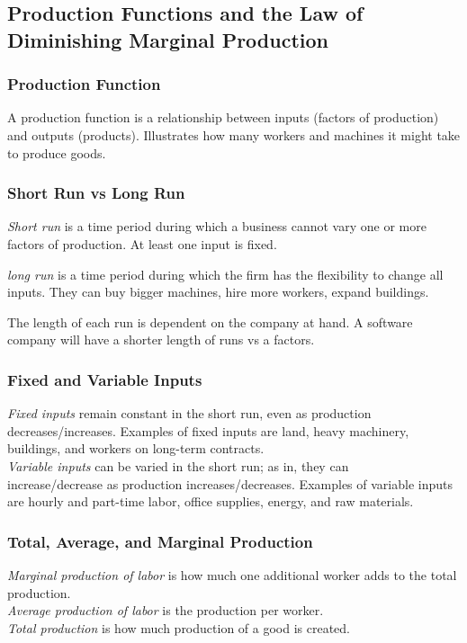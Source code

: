 \documentclass[a4paper, 12pt] {article}
\begin{document}
\subsection{Production Functions and the Law of Diminishing Marginal Production}
\subsubsection{Production Function}
A production function is a relationship between inputs (factors of production)
and outputs (products). Illustrates how many workers and machines it might take
to produce goods.

\subsubsection{Short Run vs Long Run}

\begin{description}
    \item \emph{Short run} is a time period during which a business cannot vary
        one or more factors of production. At least one input is fixed.

    \item \emph{long run} is a time period during which the firm has the
        flexibility to change all inputs. They can buy bigger machines, hire
        more workers, expand buildings.
\end{description}
The length of each run is dependent on the company at hand. A software company
will have a shorter length of runs vs a factors.

\subsubsection{Fixed and Variable Inputs}
\emph{Fixed inputs} remain constant in the short run, even as production 
\\decreases/increases. Examples of fixed inputs are land, heavy machinery,
buildings, and workers on long-term contracts.
\\
\emph{Variable inputs} can be varied in the short run; as in, they can 
\\increase/decrease as production increases/decreases. Examples of variable inputs
are hourly and part-time labor, office supplies, energy, and raw materials.

\subsubsection{Total, Average, and Marginal Production}
\emph{Marginal production of labor} is how much one additional worker adds to
the total production.
\\
\emph{Average production of labor} is the production per worker.
\\
\emph{Total production} is how much production of a good is created.
\end{document}
